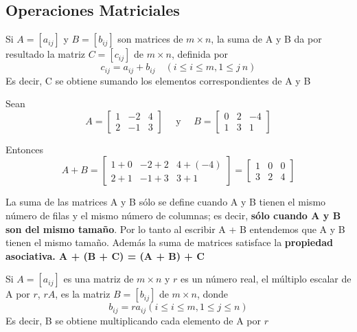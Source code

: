 \documentclass{article}
\begin{document}
\subsection{Operaciones Matriciales}

\begin{tcolorbox}[colback=blue!10!white,colframe=blue!60!black,title=Suma de Matrices]
    Si $A = [a_{ij}]$ y $B = [b_{ij}]$ son matrices de $m \times n$, la suma de A y B da por resultado la matriz $C = [c_{ij}]$ de $m \times n$, definida por $$c_{ij} = a_{ij} + b_{ij} \quad (i \leq i \leq m, 1 \leq j \ n)$$
    Es decir, C se obtiene sumando los elementos correspondientes de A y B
\end{tcolorbox}

Sean
$$A=\left[\begin{array}{lll}
    1 & -2 & 4 \\
    2 & -1 & 3
    \end{array}\right] \quad \text { y } \quad B=\left[\begin{array}{lrr}
    0 & 2 & -4 \\
    1 & 3 & 1
\end{array}\right]$$

Entonces
$$A+B=\left[\begin{array}{lll}
    1+0 & -2+2 & 4+(-4) \\
    2+1 & -1+3 & 3+1
    \end{array}\right]=\left[\begin{array}{lll}
    1 & 0 & 0 \\
    3 & 2 & 4
    \end{array}\right]$$

La suma de las matrices A y B sólo se define cuando A y B tienen el mismo número de filas y el mismo número de columnas; es decir, \textbf{sólo cuando A y B son del mismo tamaño}. Por lo tanto al escribir A + B entendemos que A y B tienen el mismo tamaño. Además la suma de matrices satisface la \textbf{propiedad asociativa. A + (B + C) = (A + B) + C}

\begin{tcolorbox}[colback=blue!10!white,colframe=blue!60!black,title=Multiplicación por un Escalar]
    Si $A = [a_{ij}]$ es una matriz de $m \times n$ y $r$ es un número real, el múltiplo escalar de A por $r$, $rA$, es la matriz $B = [b_{ij}]$ de $m \times n$, donde $$b_{ij} = ra_{ij} (i \leq i \leq m, 1 \leq j \leq n)$$
    Es decir, B se obtiene multiplicando cada elemento de A por $r$
\end{tcolorbox}
\end{document}

